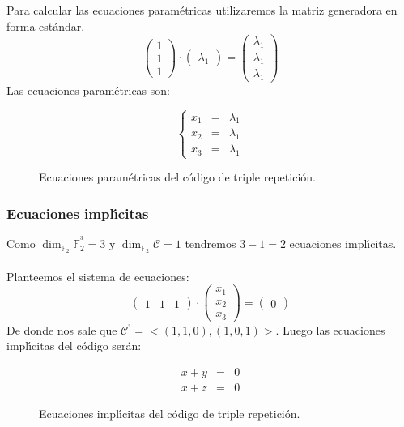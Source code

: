 Para calcular las ecuaciones param\'etricas utilizaremos la matriz generadora
en forma est\'andar.
\begin{displaymath}
\left( \begin{array}{c}
1\\
1\\
1
\end{array} \right) \cdot
\left( \begin{array}{c}
\lambda_1
\end{array} \right) =
\left( \begin{array}{c}
\lambda_1\\
\lambda_1\\
\lambda_1
\end{array} \right)
\end{displaymath}
Las ecuaciones param\'etricas son:
\begin{figure}[!h]
\begin{displaymath}
\left\{ \begin{array}{ccl}
x_1&=&\lambda_1\\
x_2&=&\lambda_1\\
x_3&=&\lambda_1
\end{array} \right.
\end{displaymath}
\caption{Ecuaciones param\'etricas del c\'odigo de triple repetici\'on.}
\end{figure}
\subsubsection{Ecuaciones impl\'{\i}citas}

Como $\dim_{\mathbb{F}_2} \mathbb{F}^{^3}_2 = 3$ y
$\dim_{\mathbb{F}_2} \mathcal{C} = 1$ tendremos $3-1=2$ ecuaciones
impl\'{\i}citas.\\ \\
%
Planteemos el sistema de ecuaciones:
\begin{displaymath}
\left( \begin{array}{ccc}
1&1&1
\end{array} \right) \cdot
\left( \begin{array}{c}
x_1 \\
x_2 \\
x_3
\end{array} \right) =
\left( \begin{array}{c}
0
\end{array} \right)
\end{displaymath}
De donde nos sale que $\mathcal{C}^{^\circ} = <(1,1,0),(1,0,1)>$. Luego las
ecuaciones impl\'{\i}citas del c\'odigo ser\'an:
\begin{figure}[!h]
\begin{eqnarray*}
x+y&=&0\\
x+z&=&0
\end{eqnarray*}
\caption{Ecuaciones impl\'{\i}citas del c\'odigo de triple repetici\'on.}
\end{figure}
%
\newpage
%
